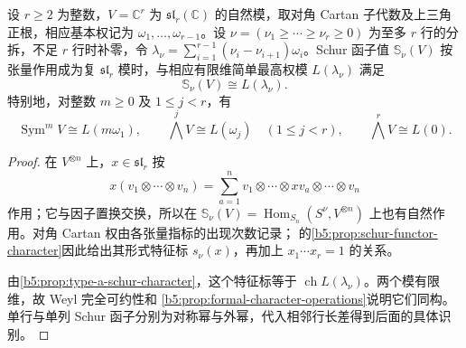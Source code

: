 \begin{theorem}\label{b5:thm:schur-highest-identification}
	设 \(r\ge2\) 为整数，\(V=\mathbb C^r\) 为 \(\mathfrak{sl}_r(\mathbb C)\) 的自然模，取对角 Cartan 子代数及上三角正根，相应基本权记为 \(\omega_1,\ldots,\omega_{r-1}\)。设 \(\nu=(\nu_1\ge\cdots\ge\nu_r\ge0)\) 为至多 \(r\) 行的分拆，不足 \(r\) 行时补零，令 \(\lambda_\nu=\sum_{i=1}^{r-1}(\nu_i-\nu_{i+1})\omega_i\)。Schur 函子值 \(\mathbb S_\nu(V)\) 按张量作用成为复 \(\mathfrak{sl}_r\) 模时，与相应有限维简单最高权模 \(L(\lambda_\nu)\) 满足
	\[
		\mathbb S_\nu(V)\cong L(\lambda_\nu).
	\]
	特别地，对整数 \(m\ge0\) 及 \(1\le j<r\)，有
	\[
		\operatorname{Sym}^mV\cong L(m\omega_1),\qquad \bigwedge^jV\cong L(\omega_j)\quad(1\le j<r),\qquad \bigwedge^rV\cong L(0).
	\]
\end{theorem}
\begin{proof}
	在 \(V^{\otimes n}\) 上，\(x\in\mathfrak{sl}_r\) 按
	\[
		x(v_1\otimes\cdots\otimes v_n) =\sum_{a=1}^n v_1\otimes\cdots\otimes xv_a\otimes\cdots\otimes v_n
	\]
	作用；它与因子置换交换，所以在 \(\mathbb S_\nu(V)=\operatorname{Hom}_{S_n}(S^\nu,V^{\otimes n})\) 上也有自然作用。对角 Cartan 权由各张量指标的出现次数记录； 的\cref{b5:prop:schur-functor-character}因此给出其形式特征标 \(s_\nu(x)\)，再加上 \(x_1\cdots x_r=1\) 的关系。

	由\cref{b5:prop:type-a-schur-character}，这个特征标等于 \(\operatorname{ch}L(\lambda_\nu)\)。两个模有限维，故 Weyl 完全可约性和 \cref{b5:prop:formal-character-operations}说明它们同构。 单行与单列 Schur 函子分别为对称幂与外幂，代入相邻行长差得到后面的具体识别。
\end{proof}

